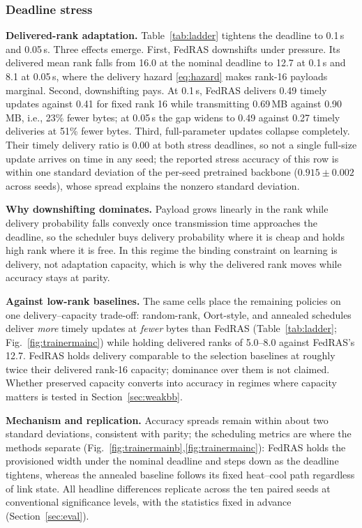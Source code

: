 \documentclass[a4paper,fleqn]{cas-dc}
\begin{document}
\subsubsection{Deadline stress}
\textbf{Delivered-rank adaptation.} Table~\ref{tab:ladder} tightens the deadline to 0.1\,s and 0.05\,s. Three effects emerge. First, FedRAS downshifts under pressure. Its delivered mean rank falls from 16.0 at the nominal deadline to 12.7 at 0.1\,s and 8.1 at 0.05\,s, where the delivery hazard \eqref{eq:hazard} makes rank-16 payloads marginal. Second, downshifting pays. At 0.1\,s, FedRAS delivers 0.49 timely updates against 0.41 for fixed rank 16 while transmitting 0.69\,MB against 0.90\,MB, i.e., 23\% fewer bytes; at 0.05\,s the gap widens to 0.49 against 0.27 timely deliveries at 51\% fewer bytes. Third, full-parameter updates collapse completely. Their timely delivery ratio is 0.00 at both stress deadlines, so not a single full-size update arrives on time in any seed; the reported stress accuracy of this row is within one standard deviation of the per-seed pretrained backbone ($0.915\pm0.002$ across seeds), whose spread explains the nonzero standard deviation.

\textbf{Why downshifting dominates.} Payload grows linearly in the rank while delivery probability falls convexly once transmission time approaches the deadline, so the scheduler buys delivery probability where it is cheap and holds high rank where it is free. In this regime the binding constraint on learning is delivery, not adaptation capacity, which is why the delivered rank moves while accuracy stays at parity.

\textbf{Against low-rank baselines.} The same cells place the remaining policies on one delivery--capacity trade-off: random-rank, Oort-style, and annealed schedules deliver \emph{more} timely updates at \emph{fewer} bytes than FedRAS (Table~\ref{tab:ladder}; Fig.~\ref{fig:trainermainc}) while holding delivered ranks of 5.0--8.0 against FedRAS's 12.7. FedRAS holds delivery comparable to the selection baselines at roughly twice their delivered rank-16 capacity; dominance over them is not claimed. Whether preserved capacity converts into accuracy in regimes where capacity matters is tested in Section~\ref{sec:weakbb}.

\textbf{Mechanism and replication.} Accuracy spreads remain within about two standard deviations, consistent with parity; the scheduling metrics are where the methods separate (Fig.~\ref{fig:trainermainb},\ref{fig:trainermainc}): FedRAS holds the provisioned width under the nominal deadline and steps down as the deadline tightens, whereas the annealed baseline follows its fixed heat--cool path regardless of link state. All headline differences replicate across the ten paired seeds at conventional significance levels, with the statistics fixed in advance (Section~\ref{sec:eval}).
\end{document}
